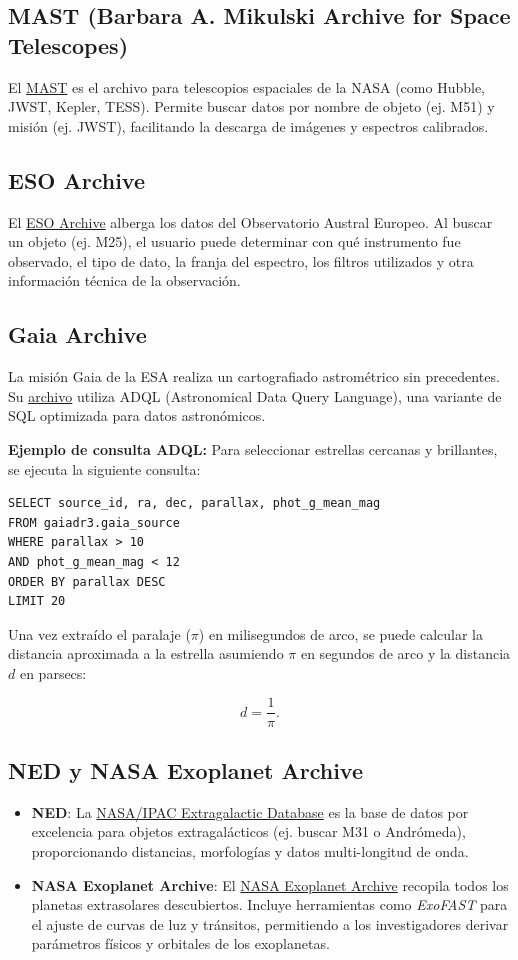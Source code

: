 \subsection{MAST (Barbara A. Mikulski Archive for Space Telescopes)}
El \href{https://mast.stsci.edu/portal/Mashup/Clients/Mast/Portal.html}{MAST} es el archivo para telescopios espaciales de la NASA (como Hubble, JWST, Kepler, TESS). Permite buscar datos por nombre de objeto (ej. M51) y misión (ej. JWST), facilitando la descarga de imágenes y espectros calibrados.

\subsection{ESO Archive}
El \href{https://archive.eso.org/cms.html}{ESO Archive} alberga los datos del Observatorio Austral Europeo. Al buscar un objeto (ej. M25), el usuario puede determinar con qué instrumento fue observado, el tipo de dato, la franja del espectro, los filtros utilizados y otra información técnica de la observación.

\subsection{Gaia Archive}
La misión Gaia de la ESA realiza un cartografiado astrométrico sin precedentes. Su \href{https://gea.esac.esa.int/archive/}{archivo} utiliza ADQL (Astronomical Data Query Language), una variante de SQL optimizada para datos astronómicos.

\textbf{Ejemplo de consulta ADQL:}
Para seleccionar estrellas cercanas y brillantes, se ejecuta la siguiente consulta:

\begin{verbatim}
SELECT source_id, ra, dec, parallax, phot_g_mean_mag 
FROM gaiadr3.gaia_source 
WHERE parallax > 10 
AND phot_g_mean_mag < 12 
ORDER BY parallax DESC 
LIMIT 20
\end{verbatim}

Una vez extraído el paralaje ($\pi$) en milisegundos de arco, se puede calcular la distancia aproximada a la estrella asumiendo $\pi$ en segundos de arco y la distancia $d$ en parsecs:

\[
d = \frac{1}{\pi}.
\]

\subsection{NED y NASA Exoplanet Archive}
\begin{itemize}
    \item \textbf{NED}: La \href{https://ned.ipac.caltech.edu/}{NASA/IPAC Extragalactic Database} es la base de datos por excelencia para objetos extragalácticos (ej. buscar M31 o Andrómeda), proporcionando distancias, morfologías y datos multi-longitud de onda.
    \item \textbf{NASA Exoplanet Archive}: El \href{https://exoplanetarchive.ipac.caltech.edu/index.html}{NASA Exoplanet Archive} recopila todos los planetas extrasolares descubiertos. Incluye herramientas como \textit{ExoFAST} para el ajuste de curvas de luz y tránsitos, permitiendo a los investigadores derivar parámetros físicos y orbitales de los exoplanetas.
\end{itemize}

